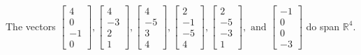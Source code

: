 \begin{exercise}
\begin{exerciseStatement}
  \end{exerciseStatement}
  \begin{exerciseAnswer}
   The vectors \(\left[\begin{array}{r}
4 \\
0 \\
-1 \\
0
\end{array}\right] , \left[\begin{array}{r}
4 \\
-3 \\
2 \\
1
\end{array}\right] , \left[\begin{array}{r}
4 \\
-5 \\
3 \\
4
\end{array}\right] , \left[\begin{array}{r}
2 \\
-1 \\
-5 \\
4
\end{array}\right] , \left[\begin{array}{r}
2 \\
-5 \\
-3 \\
1
\end{array}\right] , \text{ and } \left[\begin{array}{r}
-1 \\
0 \\
0 \\
-3
\end{array}\right]\) 
  	 do  
	span \(\mathbb{R}^4\).
  


  \end{exerciseAnswer}
\end{exercise}